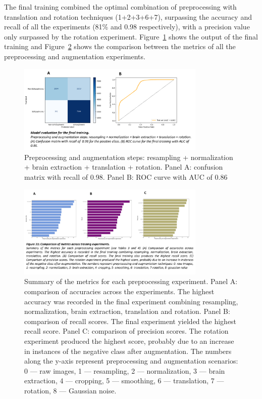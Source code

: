 The final training combined the optimal combination of preprocessing with translation and rotation techniques (1+2+3+6+7), surpassing the accuracy and recall of all the experiments (81\% and 0.98 respectively), with a precision value only surpassed by the rotation experiment. Figure~\ref{fig:eval_final_model} shows the output of the final training and Figure~\ref{fig:model_metrics_comparison} shows the comparison between the metrics of all the preprocessing and augmentation experiments.
\begin{figure}
    \centering
    \includegraphics[width=0.8\textwidth]{./figs/eval_final_model.png} %
    \caption{Preprocessing and augmentation steps: resampling + normalization + brain extraction + translation + rotation. Panel A: confusion matrix with recall of 0.98. Panel B: ROC curve with AUC of 0.86}\label{fig:eval_final_model}
\end{figure}

\begin{figure}
    \centering
    \includegraphics[width=0.8\textwidth]{./figs/model_metrics_comparison.png} %
    \caption{Summary of the metrics for each preprocessing experiment. Panel A: comparison of accuracies across the experiments. The highest accuracy was recorded in the final experiment combining resampling, normalization, brain extraction, translation and rotation. Panel B: comparison of recall scores. The final experiment yielded the highest recall score. Panel C: comparison of precision scores. The rotation experiment produced the highest score, probably due to an increase in instances of the negative class after augmentation. The numbers along the y-axis represent preprocessing and augmentation scenarios: 0 --- raw images, 1 --- resampling, 2 --- normalization, 3 --- brain extraction, 4 --- cropping, 5 --- smoothing, 6 --- translation, 7 --- rotation, 8 --- Gaussian noise.}\label{fig:model_metrics_comparison}
\end{figure}


